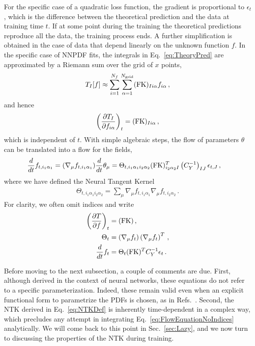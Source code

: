 For the specific case of a quadratic loss function, the gradient is proportional
to $\epsilon_t$, which is the difference between the theoretical prediction and
the data at training time $t$. If at some point during the training the
theoretical predictions reproduce all the data, the training process ends. A
further simplification is obtained in the case of data that depend linearly on
the unknown function $f$. In the specific case of NNPDF fits, the integrals in
Eq.~\eqref{eq:TheoryPred} are approximated by a Riemann sum over the grid of $x$
points,
\begin{align}
    \label{eq:FKTabDef}
    T_I[f] \approx \sum_{i=1}^{N_{f}}\sum_{\alpha=1}^{N_{\mathrm{grid}}} (\mathrm{FK})_{Ii\alpha} f_{i\alpha}\, ,
\end{align}
and hence
\begin{align}
    \label{eq:dTbydf}
    \left(\frac{\partial T_I}{\partial f_{i\alpha}}\right)_t =
        (\mathrm{FK})_{Ii\alpha}\, ,
\end{align}
which is independent of $t$. With simple algebraic steps, the flow of
parameters $\theta$ can be translated into a flow for the fields,
\begin{align}
    \label{eq:NTKFlow}
    \frac{d}{dt} &f_{t,i_1\alpha_1} = (\nabla_\mu f_{t,i_1\alpha_1}) \frac{d}{dt} \theta_\mu =
      \Theta_{t,i_1\alpha_1i_2\alpha_2}
      (\mathrm{FK})^T_{i_2\alpha_2I} \left(C_Y^{-1}\right)_{IJ} \epsilon_{t,J}\, ,
\end{align}
where we have defined the Neural Tangent Kernel~\cite{jacot2018neural}
\begin{align}
    \label{eq:NTKDef}
    \Theta_{t,i_1\alpha_1i_2\alpha_2} = \sum_\mu
    \nabla_\mu f_{t,i_1\alpha_1} \nabla_\mu f_{t,i_2\alpha_2}\, .
\end{align}
For clarity, we often omit indices and write
\begin{align}
    \label{eq:dTdfForLinearObs}
    \left(\frac{\partial T}{\partial f}\right)_t
        &= (\mathrm{FK})\, , \\
    \label{eq:NTKDefNoIndices}
    \Theta_t
        &= \left(\nabla_\mu f_t\right) \left(\nabla_\mu f_t\right)^T\, , \\
    \label{eq:FlowEquationNoIndices}
    \frac{d}{dt} f_t
        &= \Theta_t (\mathrm{FK})^T C_Y^{-1} \epsilon_t\, .
\end{align}

Before moving to the next subsection, a couple of comments are due. First,
although derived in the context of neural networks, these equations do not refer
to a specific parameterization. Indeed, these remain valid even when an explicit
functional form to parametrize the PDFs is chosen, as \eg in
Refs.~\cite{Bailey:2020ooq,Hou:2019efy,Costantini:2025wxp}. Second, the NTK
derived in Eq.~\ref{eq:NTKDef} is inherently time-dependent in a complex way,
which precludes any attempt in integrating Eq.~\ref{eq:FlowEquationNoIndices}
analytically. We will come back to this point in Sec.~\ref{sec:Lazy}, and we now
turn to discussing the properties of the NTK during training.


